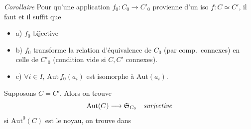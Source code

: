 \documentclass[11pt,a4paper]{article}
\begin{document}
\emph{Corollaire} Pour qu'une application $f_0 : C_0 \to C'_0$ provienne d'un iso $f : C \simeq C'$, il faut et il suffit que
\begin{itemize}
  \item a) $f_0$  bijective
  \item b) $f_0$ transforme la relation d'équivalence de $C_0$ (par comp.\ connexes) en celle de $C'_0$ (condition vide si $C, C'$ connexes).
  \item c) $\forall i \in I$, $\mathrm{Aut}\, f_0(a_i)$ est isomorphe à $\mathrm{Aut}(a_i)$.
\end{itemize}

\struck{\ill{}} Supposons $C = C'$. Alors on trouve
\[
  \mathrm{Aut}(C) \longrightarrow \mathfrak{S}_{C_0} \quad \text{\textit{surjective}}
\]
si $\mathrm{Aut}^0(C)$ est le noyau, on trouve dans
\end{document}
